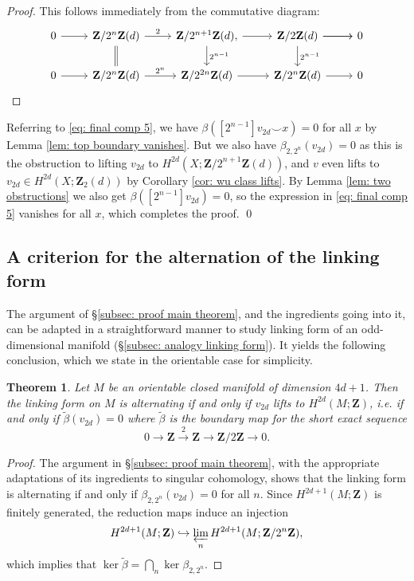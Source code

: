 \documentclass[10pt, reqno]{amsart}
\numberwithin{equation}{subsection}
\newcommand{\wt}[1]{\widetilde{#1}}
\newcommand{\Z}{\mathbf{Z}}
\DeclareMathOperator{\et}{\acute{e}t}
\newtheorem{thm}{Theorem}[section]
\theoremstyle{remark}
\begin{document}
\begin{proof}
This follows immediately from the commutative diagram:
\[
\begin{tikzcd}
0 \ar[r]  &  \Z/2^n \Z(d) \ar[r, "2"] \ar[d, equals] &   \Z/2^{n+1} \Z(d) \ar[r], \ar[d, "2^{n-1}"] &  \Z/2 \Z(d) \ar[r] \ar[d, "2^{n-1}"]  \ar[r] & 0 \\
0 \ar[r] & \Z/2^n \Z (d) \ar[r, "2^{n}"] & \Z/2^{2n} \Z (d)  \ar[r] & \Z/2^n \Z(d) \ar[r] & 0
\end{tikzcd}
\]
\end{proof}


Referring to \eqref{eq: final comp 5}, we have $\beta([2^{n-1}] v_{2d} \smile x )   = 0$ for all $x$ by Lemma \ref{lem: top boundary vanishes}. But we also have $\beta_{2,2^n}(v_{2d})  = 0$ as this is the obstruction to lifting $v_{2d}$ to $H^{2d}_{\et}(X; \Z/2^{n+1} \Z(d))$, and $v$ even lifts to $v_{2d} \in H^{2d}_{\et}(X; \Z_2(d))$ by Corollary \ref{cor: wu class lifts}. By Lemma \ref{lem: two obstructions} we also get $\beta([2^{n-1}] v_{2d}) = 0$, so the expression in \eqref{eq: final comp 5} vanishes for all $x$, which completes the proof. \qed

\subsection{A criterion for the alternation of the linking form}\label{subsec: alternating linking form}

The argument of \S \ref{subsec: proof main theorem}, and the ingredients going into it, can be adapted in a straightforward manner to study linking form of an odd-dimensional manifold (\S \ref{subsec: analogy linking form}). It yields the following conclusion, which we state in the orientable case for simplicity. 

\begin{thm}\label{thm: alternating linking form}
Let $M$ be an orientable closed manifold of dimension $4d+1$. Then the linking form on $M$ is alternating if and only if $v_{2d}$ lifts to $H^{2d}(M; \Z)$, i.e. if and only if $\wt{\beta} (v_{2d}) = 0$ where $\wt{\beta}$ is the boundary map for the short exact sequence
\[
0 \rightarrow \Z \xrightarrow{2} \Z \rightarrow \Z/2 \Z \rightarrow 0.
\]
\end{thm}

\begin{proof}
The argument in \S \ref{subsec: proof main theorem}, with the appropriate adaptations of its ingredients to singular cohomology, shows that the linking form is alternating if and only if $\beta_{2,2^n}(v_{2d}) = 0$ for all $n$. Since $H^{2d+1}(M; \Z)$ is finitely generated, the reduction maps induce an injection 
\[
H^{2d+1}(M; \Z) \hookrightarrow \varprojlim_n H^{2d+1}(M; \Z/2^n  \Z),
\]
which implies that $\ker \wt{\beta} = \bigcap_n \ker \beta_{2,2^n}$. 
\end{proof}
\end{document}
